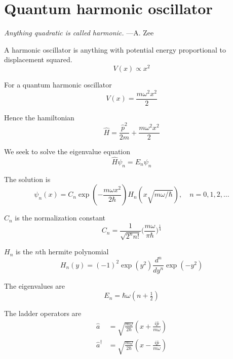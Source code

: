 

\section*{Quantum harmonic oscillator}

{\it Anything quadratic is called harmonic.} ---A. Zee

\bigskip
A harmonic oscillator is anything with potential energy proportional to displacement squared.
\begin{equation*}
V(x)\propto x^2
\end{equation*}

For a quantum harmonic oscillator
\begin{equation*}
V(x)=\frac{m\omega^2 x^2}{2}
\end{equation*}

Hence the hamiltonian
\begin{equation*}
\hat H=\frac{\hat p^2}{2m}+\frac{m\omega^2 x^2}{2}
\end{equation*}

We seek to solve the eigenvalue equation
\begin{equation*}
\hat H\psi_n=E_n\psi_n
\end{equation*}

The solution is
\begin{equation*}
\psi_n(x)=C_n\exp\left(-\frac{m\omega x^2}{2\hbar}\right)
H_n\left(x\sqrt{m\omega/\hbar}\right),\quad n=0,1,2,\ldots
\end{equation*}

$C_n$ is the normalization constant
\begin{equation*}
C_n=\frac{1}{\sqrt{2^nn!}}\biggl(\frac{m\omega}{\pi\hbar}\biggr)^{\frac{1}{4}}
\end{equation*}

$H_n$ is the $n$th hermite polynomial
\begin{equation*}
H_n(y)=(-1)^2\exp\left(y^2\right)\frac{d^n}{dy^n}\exp\left(-y^2\right)
\end{equation*}

The eigenvalues are
\begin{equation*}
E_n=\hbar\omega\left(n+\tfrac{1}{2}\right)
\end{equation*}

The ladder operators are
\begin{align*}
\hat a&=\sqrt{\frac{m\omega}{2\hbar}}\left(x+\frac{i\hat p}{m\omega}\right)
\\[1ex]
\hat a^\dag&=\sqrt{\frac{m\omega}{2\hbar}}\left(x-\frac{i\hat p}{m\omega}\right)
\end{align*}

